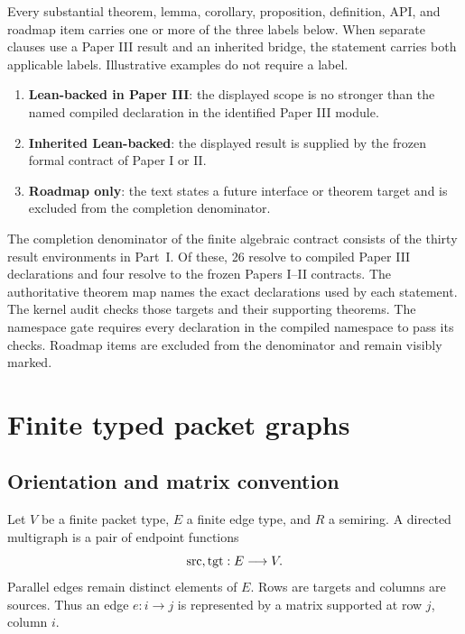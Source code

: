 Every substantial theorem, lemma, corollary, proposition, definition, API,
and roadmap item carries one or more of the three labels below. When separate
clauses use a Paper III result and an inherited bridge, the statement carries
both applicable labels. Illustrative examples do not require a label.
\begin{enumerate}[label=\textbf{S\arabic*.},leftmargin=3.2em]
\item \textbf{Lean-backed in Paper III}: the displayed scope is no stronger
than the named compiled declaration in the identified Paper III module.
\item \textbf{Inherited Lean-backed}: the displayed result is supplied by the
frozen formal contract of Paper I or II.
\item \textbf{Roadmap only}: the text states a future interface or theorem
target and is excluded from the completion denominator.
\end{enumerate}

\begin{boundary}
The completion denominator of the finite algebraic contract consists of the
thirty result environments in Part~I. Of these, 26 resolve to compiled
Paper III declarations and four resolve to the frozen Papers I--II
contracts. The authoritative theorem map names the exact declarations used
by each statement. The kernel audit checks those targets and their supporting
theorems. The namespace gate requires every declaration in the compiled
 namespace to pass its checks. Roadmap items are
excluded from the denominator and remain visibly marked.
\end{boundary}

\section{Finite typed packet graphs}
\label{sec:edge-operators}

\subsection{Orientation and matrix convention}

Let $V$ be a finite packet type, $E$ a finite edge type, and $R$ a semiring.
A directed multigraph is a pair of endpoint functions
\[
  \operatorname{src},\operatorname{tgt}:E\longrightarrow V.
\]
Parallel edges remain distinct elements of $E$.  Rows are targets and columns
are sources.  Thus an edge $e:i\to j$ is represented by a matrix supported at
row $j$, column $i$.

